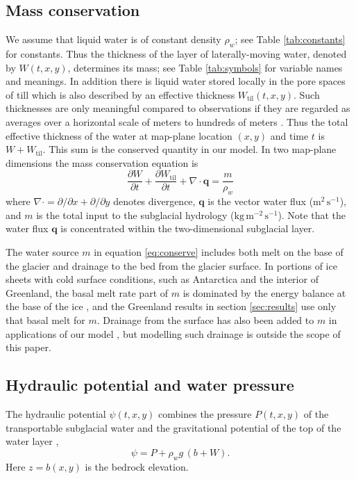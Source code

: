 \documentclass[gmd]{copernicus}   %
\begin{document}
\subsection{Mass conservation}  We assume that liquid water is of constant density $\rho_w$; see Table \ref{tab:constants} for constants.  Thus the thickness of the layer of laterally-moving water, denoted by $W(t,x,y)$, determines its mass; see Table \ref{tab:symbols} for variable names and meanings.  In addition there is liquid water stored locally in the pore spaces of till \citep{Tulaczyketal2000b} which is also described by an effective thickness $W_{\text{til}}(t,x,y)$.  Such thicknesses are only meaningful compared to observations if they are regarded as averages over a horizontal scale of meters to hundreds of meters \citep{FlowersClarke2002_theory}.  Thus the total effective thickness of the water at map-plane location $(x,y)$ and time $t$ is $W + W_{\text{til}}$.  This sum is the conserved quantity in our model.  In two map-plane dimensions the mass conservation equation is \citep[compare][]{Clarke05}
\begin{equation} \label{eq:conserve}
\frac{\partial W}{\partial t} + \frac{\partial W_{\text{til}}}{\partial t} + \nabla\cdot \mathbf{q} = \frac{m}{\rho_w}
\end{equation}
where $\nabla\cdot = \partial/\partial x + \partial/\partial y$ denotes divergence, $\mathbf{q}$ is the vector water flux ($\text{m}^2\,\text{s}^{-1}$), and $m$ is the total input to the subglacial hydrology ($\text{kg}\,\text{m}^{-2}\,\text{s}^{-1}$).  Note that the water flux $\mathbf{q}$ is concentrated within the two-dimensional subglacial layer.

The water source $m$ in equation \eqref{eq:conserve} includes both melt on the base of the glacier and drainage to the bed from the glacier surface.  In portions of ice sheets with cold surface conditions, such as Antarctica and the interior of Greenland, the basal melt rate part of $m$ is dominated by the energy balance at the base of the ice \citep{AschwandenBuelerKhroulevBlatter}, and the Greenland results in section \ref{sec:results} use only that basal melt for $m$.  Drainage from the surface has also been added to $m$ in applications of our model \citep{vanPeltthesis}, but modelling such drainage is outside the scope of this paper.

\subsection{Hydraulic potential and water pressure}  The  hydraulic potential $\psi(t,x,y)$ combines the pressure $P(t,x,y)$ of the transportable subglacial water and the gravitational potential of the top of the water layer \citep{Goelleretal2013,Hewittetal2012},
\begin{equation} \label{eq:potential}
\psi = P + \rho_w g\, (b+W).
\end{equation}
Here $z=b(x,y)$ is the bedrock elevation.
\end{document}
